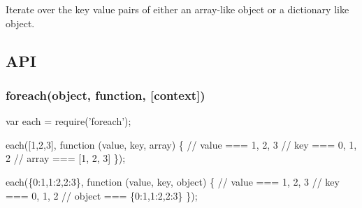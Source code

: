 Iterate over the key value pairs of either an array-\/like object or a dictionary like object.

\href{https://ci.testling.com/manuelstofer/foreach}{\tt }

\subsection*{A\+PI}

\subsubsection*{foreach(object, function, \mbox{[}context\mbox{]})}


\begin{DoxyCode}
var each = require('foreach');

each([1,2,3], function (value, key, array) \{
    // value === 1, 2, 3
    // key === 0, 1, 2
    // array === [1, 2, 3]
\});

each(\{0:1,1:2,2:3\}, function (value, key, object) \{
    // value === 1, 2, 3
    // key === 0, 1, 2
    // object === \{0:1,1:2,2:3\}
\});
\end{DoxyCode}
 